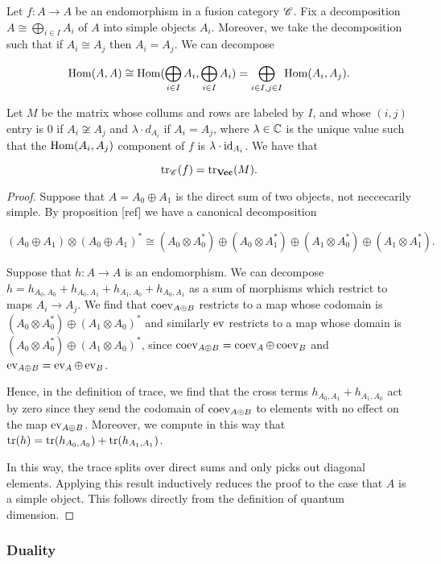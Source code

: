 \begin{corollary} Let $f:A\to A$ be an endomorphism in a fusion category $\mathscr{C}$. Fix a decomposition $A\cong \bigoplus_{i\in I}A_i$ of $A$ into simple objects $A_i$. Moreover, we take the decomposition such that if $A_i\cong A_j$ then $A_i=A_j$. We can decompose

$$\operatorname{Hom}(A,A)\cong \operatorname{Hom}(\bigoplus_{i\in I} A_i,\bigoplus_{i\in I}A_i)=\bigoplus_{i\in I, j\in I}\operatorname{Hom}(A_i,A_j).$$

Let $M$ be the matrix whose collums and rows are labeled by $I$, and whose $(i,j)$ entry is $0$ if $A_i\not\cong A_j$ and $\lambda \cdot d_{A_i}$ if $A_i=A_j$, where $\lambda\in \mathbb{C}$ is the unique value such that the $\operatorname{Hom}(A_i,A_j)$ component of $f$ is $\lambda\cdot \operatorname{id}_{A_i}$. We have that

$$\operatorname{tr}_{\mathscr{C}}(f)=\operatorname{tr}_{\mathbf{Vec}}(M).$$

\end{corollary}
\begin{proof} Suppose that $A=A_0\oplus A_1$ is the direct sum of two objects, not neccecarily simple. By proposition [ref] we have a canonical decomposition

$$(A_0\oplus A_1)\otimes (A_0\oplus A_1)^*\cong (A_0\otimes A_0^*) \oplus (A_0\otimes A_1^*) \oplus (A_1\otimes A_0^{*})\oplus (A_1\otimes A_1^*).$$

Suppose that $h:A\to A$ is an endomorphism. We can decompose $h=h_{A_0,A_0}+h_{A_0,A_1}+h_{A_1,A_0}+h_{A_0,A_1}$ as a sum of morphisms which restrict to maps $A_i\to A_j$. We find that $\operatorname{coev}_{A\oplus B}$ restricts to a map whose codomain is  $(A_0\otimes A_0^*) \oplus (A_1\otimes A_0)^*$ and similarly $\operatorname{ev}$ restricts to a map whose domain is $(A_0\otimes A_0^*) \oplus (A_1\otimes A_0)^*$, since $\operatorname{coev}_{A\oplus B}=\operatorname{coev}_{A}\oplus \operatorname{coev}_{B}$ and $\operatorname{ev}_{A\oplus B}=\operatorname{ev}_{A}\oplus \operatorname{ev}_{B}$.

Hence, in the definition of trace, we find that the cross terms $h_{A_0,A_1}+h_{A_1,A_0}$ act by zero since they send the codomain of $\operatorname{coev}_{A\oplus B}$ to elements with no effect on the map $\operatorname{ev}_{A\oplus B}$. Moreover, we compute in this way that $\operatorname{tr}(h)=\operatorname{tr}(h_{A_0,A_0})+\operatorname{tr}(h_{A_1,A_1})$.

In this way, the trace splits over direct sums and only picks out diagonal elements. Applying this result inductively reduces the proof to the case that $A$ is a simple object. This follows directly from the definition of quantum dimension.
\end{proof}

\subsubsection{Duality}


